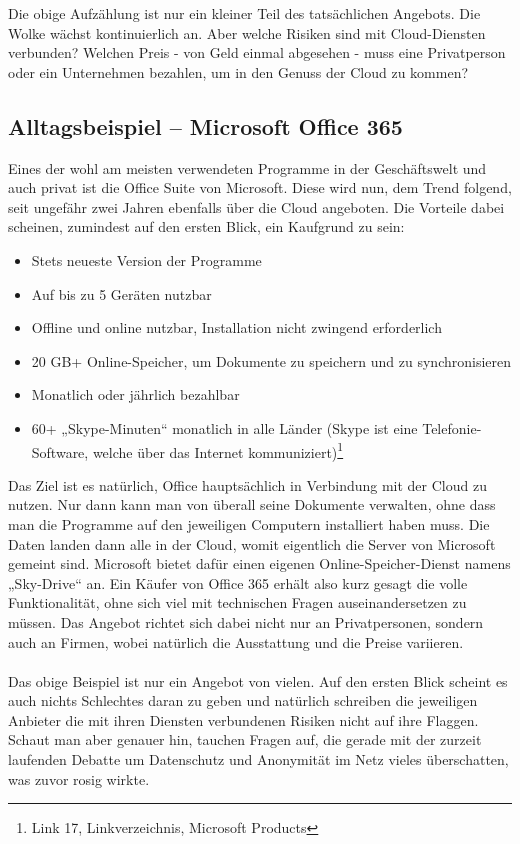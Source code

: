Die obige Aufzählung ist nur ein kleiner Teil des tatsächlichen Angebots. Die Wolke wächst kontinuierlich an. Aber welche Risiken sind mit Cloud-Diensten verbunden? Welchen Preis - von Geld einmal abgesehen - muss eine Privatperson oder ein Unternehmen bezahlen, um in den Genuss der Cloud zu kommen?

\subsection{Alltagsbeispiel – Microsoft Office 365}
Eines der wohl am meisten verwendeten Programme in der Geschäftswelt und auch privat ist die Office Suite von Microsoft. Diese wird nun, dem Trend folgend, seit ungefähr zwei Jahren ebenfalls über die Cloud angeboten. Die Vorteile dabei scheinen, zumindest auf den ersten Blick, ein Kaufgrund zu sein:

\begin{itemize}
\item Stets neueste Version der Programme
\item Auf bis zu 5 Geräten nutzbar
\item Offline und online nutzbar, Installation nicht zwingend erforderlich
\item 20 GB+ Online-Speicher, um Dokumente zu speichern und zu synchronisieren
\item Monatlich oder jährlich bezahlbar
\item 60+ „Skype-Minuten“ monatlich in alle Länder (Skype ist eine Telefonie-Software, welche über das Internet kommuniziert)\footnote{Link 17, Linkverzeichnis, Microsoft Products}
\end{itemize}

Das Ziel ist es natürlich, Office hauptsächlich in Verbindung mit der Cloud zu nutzen. Nur dann kann man von überall seine Dokumente verwalten, ohne dass man die Programme auf den jeweiligen Computern installiert haben muss. Die Daten landen dann alle in der Cloud, womit eigentlich die Server von Microsoft gemeint sind. Microsoft bietet dafür einen eigenen Online-Speicher-Dienst namens „Sky-Drive“ an. Ein Käufer von Office 365 erhält also kurz gesagt die volle Funktionalität, ohne sich viel mit technischen Fragen auseinandersetzen zu müssen. Das Angebot richtet sich dabei nicht nur an Privatpersonen, sondern auch an Firmen, wobei natürlich die Ausstattung und die Preise variieren.
\\
\\
Das obige Beispiel ist nur ein Angebot von vielen. Auf den ersten Blick scheint es auch nichts Schlechtes daran zu geben und natürlich schreiben die jeweiligen Anbieter die mit ihren Diensten verbundenen Risiken nicht auf ihre Flaggen. Schaut man aber genauer hin, tauchen Fragen auf, die gerade mit der zurzeit laufenden Debatte um Datenschutz und Anonymität im Netz vieles überschatten, was zuvor rosig wirkte.


